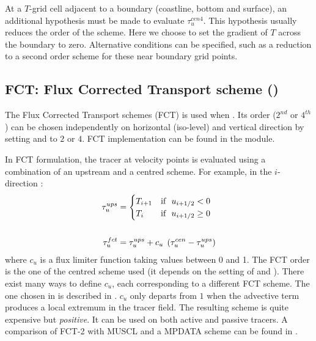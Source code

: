 \documentclass[../main/NEMO_manual]{subfiles}
\begin{document}
At a $T$-grid cell adjacent to a boundary (coastline, bottom and surface),
an additional hypothesis must be made to evaluate $\tau_u^{cen4}$.
This hypothesis usually reduces the order of the scheme.
Here we choose to set the gradient of $T$ across the boundary to zero.
Alternative conditions can be specified, such as a reduction to a second order scheme for
these near boundary grid points.

\subsection{FCT: Flux Corrected Transport scheme (\protect{})}
\label{subsec:TRA_adv_tvd}

The Flux Corrected Transport schemes (FCT) is used when .
Its order ($2^{nd}$ or $4^{th}$) can be chosen independently on horizontal (iso-level) and vertical direction by
setting  and  to $2$ or $4$.
FCT implementation can be found in the  module.

In FCT formulation, the tracer at velocity points is evaluated using a combination of an upstream and
a centred scheme.
For example, in the $i$-direction :
\begin{equation}
  \label{eq:tra_adv_fct}
  \begin{split}
    \tau_u^{ups}&=
    \begin{cases}
      T_{i+1} 	& \text{if $\ u_{i+1/2} <     0$} \hfill \\
      T_i   		& \text{if $\ u_{i+1/2} \geq 0$} \hfill \\
    \end{cases}
    \\ \\
    \tau_u^{fct}&=\tau_u^{ups} +c_u \;\left( {\tau_u^{cen} -\tau_u^{ups} } \right)
  \end{split}
\end{equation}
where $c_u$ is a flux limiter function taking values between 0 and 1.
The FCT order is the one of the centred scheme used
(\ie it depends on the setting of  and ).
There exist many ways to define $c_u$, each corresponding to a different FCT scheme.
The one chosen in \NEMO is described in \citet{Zalesak_JCP79}.
$c_u$ only departs from $1$ when the advective term produces a local extremum in the tracer field.
The resulting scheme is quite expensive but \emph{positive}.
It can be used on both active and passive tracers.
A comparison of FCT-2 with MUSCL and a MPDATA scheme can be found in \citet{Levy_al_GRL01}.
\end{document}
